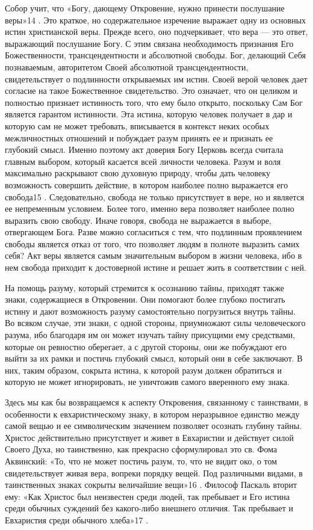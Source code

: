\documentclass[a5paper,10pt]{article}
\begin{document}
Собор учит, что «Богу, дающему Откровение, нужно принести послушание веры»14 .
Это краткое, но содержательное изречение выражает одну из основных истин
христианской веры. Прежде всего, оно подчеркивает, что вера — это ответ,
выражающий послушание Богу. С этим связана необходимость признания Его
Божественности, трансцендентности и абсолютной свободы. Бог, делающий Себя
познаваемым, авторитетом Своей абсолютной трансцендентности, свидетельствует о
подлинности открываемых им истин. Своей верой человек дает согласие на такое
Божественное свидетельство. Это означает, что он целиком и полностью признает
истинность того, что ему было открыто, поскольку Сам Бог является гарантом
истинности. Эта истина, которую человек получает в дар и которую сам не может
требовать, вписывается в контекст неких особых межличностных отношений и
побуждает разум принять ее и признать ее глубокий смысл. Именно поэтому акт
доверия Богу Церковь всегда считала главным выбором, который касается всей
личности человека. Разум и воля максимально раскрывают свою духовную природу,
чтобы дать человеку возможность совершить действие, в котором наиболее полно
выражается его свобода15 . Следовательно, свобода не только присутствует в
вере, но и является ее непременным условием. Более того, именно вера позволяет
наиболее полно выразить свою свободу. Иначе говоря, свобода не выражается в
выборе, отвергающем Бога. Разве можно согласиться с тем, что подлинным
проявлением свободы является отказ от того, что позволяет людям в полноте
выразить самих себя? Акт веры является самым значительным выбором в жизни
человека, ибо в нем свобода приходит к достоверной истине и решает жить в
соответствии с ней.

На помощь разуму, который стремится к осознанию тайны, приходят также знаки,
содержащиеся в Откровении. Они помогают более глубоко постигать истину и дают
возможность разуму самостоятельно погрузиться внутрь тайны. Во всяком случае,
эти знаки, с одной стороны, приумножают силы человеческого разума, ибо
благодаря им он может изучать тайну присущими ему средствами, которые он
ревностно оберегает, а с другой стороны, они же побуждают его выйти за их рамки
и постичь глубокий смысл, который они в себе заключают. В них, таким образом,
сокрыта истина, к которой разум должен обратиться и которую не может
игнорировать, не уничтожив самого вверенного ему знака.

Здесь мы как бы возвращаемся к аспекту Откровения, связанному с таинствами, в
особенности к евхаристическому знаку, в котором неразрывное единство между
самой вещью и ее символическим значением позволяет осознать глубину тайны.
Христос действительно присутствует и живет в Евхаристии и действует силой
Своего Духа, но таинственно, как прекрасно сформулировал это св. Фома
Аквинский: «То, что не может постичь разум, то, что не видит око, о том
свидетельствует живая вера, вопреки порядку вещей. Под различными видами, в
таинственных знаках сокрыты величайшие вещи»16 . Философ Паскаль вторит ему:
«Как Христос был неизвестен среди людей, так пребывает и Его истина среди
обычных суждений без какого-либо внешнего отличия. Так пребывает и Евхаристия
среди обычного хлеба»17 .
\end{document}
